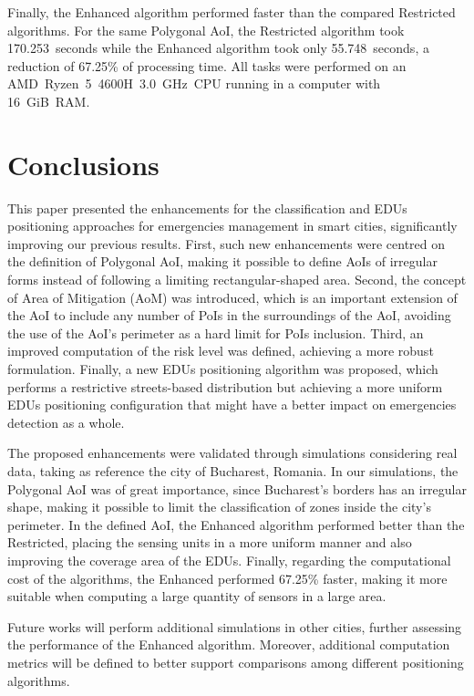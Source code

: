 \begin{refsection}
Finally, the Enhanced algorithm performed faster than the compared Restricted algorithms. For the same Polygonal AoI, the Restricted algorithm took 170.253~seconds while the Enhanced algorithm took only 55.748~seconds, a reduction of 67.25\% of processing time. All tasks were performed on an AMD~Ryzen~5~4600H~3.0~GHz~CPU running in a computer with 16~GiB~RAM.

\section{Conclusions}\label{sec:conclusion}

This paper presented the enhancements for the classification and EDUs positioning approaches for emergencies management in smart cities, significantly improving our previous results. First, such new enhancements were centred on the definition of Polygonal AoI, making it possible to define AoIs of irregular forms instead of following a limiting rectangular-shaped area. Second, the concept of Area of Mitigation (AoM) was introduced, which is an important extension of the AoI to include any number of PoIs in the surroundings of the AoI, avoiding the use of the AoI's perimeter as a hard limit for PoIs inclusion. Third, an improved computation of the risk level was defined, achieving a more robust formulation. Finally, a new EDUs positioning algorithm was proposed, which performs a restrictive streets-based distribution but achieving a more uniform EDUs positioning configuration that might have a better impact on emergencies detection as a whole. 

The proposed enhancements were validated through simulations considering real data, taking as reference the city of Bucharest, Romania. In our simulations, the Polygonal AoI was of great importance, since Bucharest's borders has an irregular shape, making it possible to limit the classification of zones inside the city's perimeter. In the defined AoI, the Enhanced algorithm performed better than the Restricted, placing the sensing units in a more uniform manner and also improving the coverage area of the EDUs. Finally, regarding the computational cost of the algorithms, the Enhanced performed 67.25\% faster, making it more suitable when computing a large quantity of sensors in a large area. 

Future works will perform additional simulations in other cities, further assessing the performance of the Enhanced algorithm. Moreover, additional computation metrics will be defined to better support comparisons among different positioning algorithms.

\printbibliography[heading=subbibliography]
\end{refsection}
